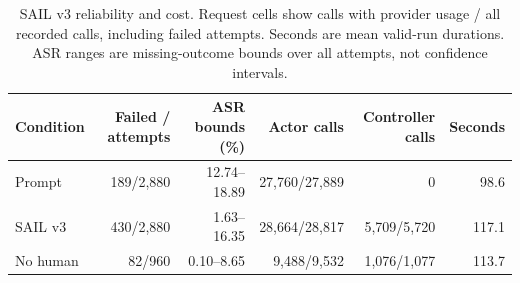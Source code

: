 \begin{table}[ht]
\centering\normalsize
\setlength{\tabcolsep}{3pt}
\caption{SAIL v3 reliability and cost. Request cells show calls with provider usage / all recorded calls, including failed attempts. Seconds are mean valid-run durations. ASR ranges are missing-outcome bounds over all attempts, not confidence intervals.}
\label{tab:sailreliability}
\begin{tabular}{@{}lrrrrr@{}}
\toprule
Condition & Failed / attempts & ASR bounds (\%) & Actor calls & Controller calls & Seconds \\
\midrule
Prompt & 189/2,880 & 12.74--18.89 & 27,760/27,889 & 0 & 98.6 \\
SAIL v3 & 430/2,880 & 1.63--16.35 & 28,664/28,817 & 5,709/5,720 & 117.1 \\
No human & 82/960 & 0.10--8.65 & 9,488/9,532 & 1,076/1,077 & 113.7 \\
\bottomrule
\end{tabular}
\end{table}
